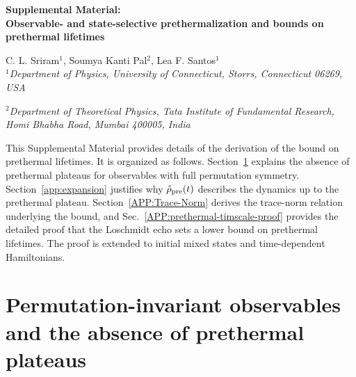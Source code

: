 \documentclass[aps,prl,amsfonts,floatfix,superscriptaddress,longbibliography,twocolumn,footinbib]{revtex4-2}
\begin{document}

\onecolumngrid

\vspace*{0.5cm}

\begin{center}

{\large \bf Supplemental Material: 
\\Observable- and state-selective prethermalization and bounds on prethermal lifetimes}\\

\vspace{0.6cm}

C. L. Sriram$^1$, Soumya Kanti Pal$^2$, Lea F. Santos$^1$\\

$^1${\it Department of Physics, University of Connecticut, Storrs, Connecticut 06269, USA}

$^2${\it Department of Theoretical Physics, Tata Institute of Fundamental Research, Homi Bhabha Road, Mumbai 400005, India}



\end{center}

\vspace{0.6cm}


\setcounter{secnumdepth}{2}
\setcounter{section}{0}
\renewcommand\thesection{\Roman{section}}
\renewcommand\thesubsection{\thesection.\Alph{subsection}}
\renewcommand{\thefigure}{S\arabic{figure}}
\renewcommand{\theequation}{S\arabic{equation}}


This Supplemental Material provides details of the derivation of the bound on prethermal lifetimes. It is organized as follows. Section~\ref{App:Proof_Obs} explains the absence of prethermal plateaus for observables with full permutation symmetry. Section~\ref{app:expansion} justifies why $\hat\rho_{\rm pre}(t)$ describes the dynamics up to the prethermal plateau. Section~\ref{APP:Trace-Norm} derives the trace-norm relation underlying the bound, and Sec.~\ref{APP:prethermal-timscale-proof} provides the detailed proof that the Loschmidt echo sets a lower bound on prethermal lifetimes. The proof is extended to initial mixed states and time-dependent Hamiltonians.


\section{Permutation-invariant observables and the absence of prethermal plateaus}
\label{App:Proof_Obs}
\end{document}

